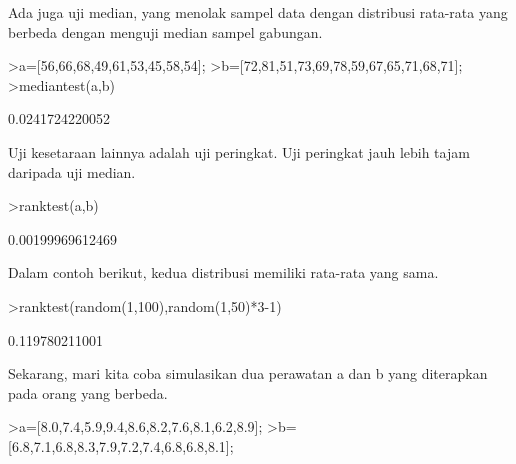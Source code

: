 \documentclass[a4paper,10pt]{article}
\begin{document}
\begin{eulernotebook}
\begin{eulercomment}
\begin{eulercomment}
\begin{eulercomment}
\begin{eulercomment}
\begin{eulercomment}
\begin{eulercomment}
\begin{eulercomment}
\begin{eulercomment}
\begin{eulercomment}
\begin{eulercomment}
\begin{eulercomment}
\begin{eulercomment}
\begin{eulercomment}
\begin{eulercomment}
\begin{eulercomment}
\begin{eulercomment}
\begin{eulercomment}
\begin{eulercomment}
\begin{eulercomment}
\begin{eulercomment}
\begin{eulercomment}
\begin{eulercomment}
\begin{eulercomment}
\begin{eulercomment}
\begin{eulercomment}
\begin{eulercomment}
\begin{eulercomment}
\begin{eulercomment}
\begin{eulercomment}
\begin{eulercomment}
\begin{eulercomment}
\begin{eulercomment}
\begin{eulercomment}
Ada juga uji median, yang menolak sampel data dengan distribusi
rata-rata yang berbeda dengan menguji median sampel gabungan.
\end{eulercomment}
\begin{eulerprompt}
>a=[56,66,68,49,61,53,45,58,54];
>b=[72,81,51,73,69,78,59,67,65,71,68,71];
>mediantest(a,b)
\end{eulerprompt}
\begin{euleroutput}
  0.0241724220052
\end{euleroutput}
\begin{eulercomment}
Uji kesetaraan lainnya adalah uji peringkat. Uji peringkat jauh lebih
tajam daripada uji median.
\end{eulercomment}
\begin{eulerprompt}
>ranktest(a,b)
\end{eulerprompt}
\begin{euleroutput}
  0.00199969612469
\end{euleroutput}
\begin{eulercomment}
Dalam contoh berikut, kedua distribusi memiliki rata-rata yang sama.
\end{eulercomment}
\begin{eulerprompt}
>ranktest(random(1,100),random(1,50)*3-1)
\end{eulerprompt}
\begin{euleroutput}
  0.119780211001
\end{euleroutput}
\begin{eulercomment}
Sekarang, mari kita coba simulasikan dua perawatan a dan b yang
diterapkan pada orang yang berbeda.
\end{eulercomment}
\begin{eulerprompt}
>a=[8.0,7.4,5.9,9.4,8.6,8.2,7.6,8.1,6.2,8.9];
>b=[6.8,7.1,6.8,8.3,7.9,7.2,7.4,6.8,6.8,8.1];
\end{eulerprompt}
\begin{eulercomment}

\end{eulercomment}
\end{eulercomment}
\end{eulercomment}
\end{eulercomment}
\end{eulercomment}
\end{eulercomment}
\end{eulercomment}
\end{eulercomment}
\end{eulercomment}
\end{eulercomment}
\end{eulercomment}
\end{eulercomment}
\end{eulercomment}
\end{eulercomment}
\end{eulercomment}
\end{eulercomment}
\end{eulercomment}
\end{eulercomment}
\end{eulercomment}
\end{eulercomment}
\end{eulercomment}
\end{eulercomment}
\end{eulercomment}
\end{eulercomment}
\end{eulercomment}
\end{eulercomment}
\end{eulercomment}
\end{eulercomment}
\end{eulercomment}
\end{eulercomment}
\end{eulercomment}
\end{eulercomment}
\end{eulercomment}
\end{eulernotebook}
\end{document}
